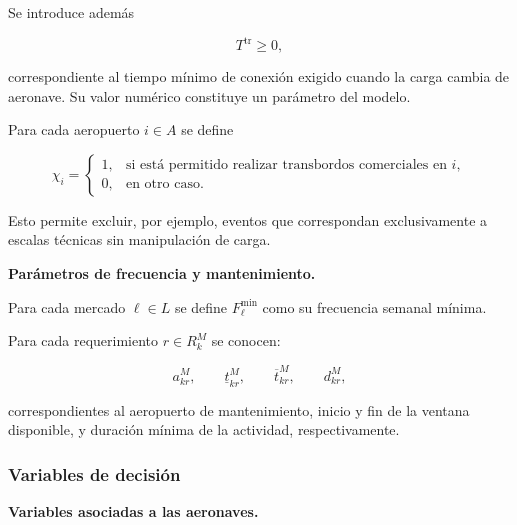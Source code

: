 Se introduce además

\[
T^{\mathrm{tr}}\geq0,
\]

correspondiente al tiempo mínimo de conexión exigido cuando la carga cambia de aeronave.
Su valor numérico constituye un parámetro del modelo.

Para cada aeropuerto $i\in A$ se define

\[
\chi_i=
\begin{cases}
1, & \text{si está permitido realizar transbordos comerciales en }i,\\
0, & \text{en otro caso}.
\end{cases}
\]

Esto permite excluir, por ejemplo, eventos que correspondan exclusivamente a escalas
técnicas sin manipulación de carga.


\vspace{0.5em}
\noindent\textbf{Parámetros de frecuencia y mantenimiento.}

Para cada mercado $\ell\in L$ se define $F_\ell^{\min}$ como su frecuencia semanal mínima.

Para cada requerimiento $r\in R_k^M$ se conocen:

\[
a_{kr}^{M},
\qquad
\underline{t}_{kr}^{M},
\qquad
\overline{t}_{kr}^{M},
\qquad
d_{kr}^{M},
\]

correspondientes al aeropuerto de mantenimiento, inicio y fin de la ventana disponible, y
duración mínima de la actividad, respectivamente.


\subsubsection{Variables de decisión}
\label{app:variables_milp}

\vspace{0.5em}
\noindent\textbf{Variables asociadas a las aeronaves.}


